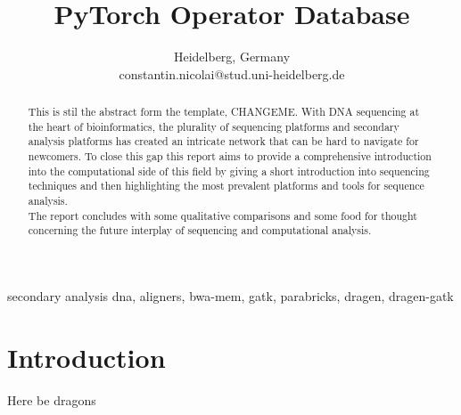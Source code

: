 \documentclass[conference]{IEEEtran}
\begin{document}
\title{PyTorch Operator Database}

\author{
Heidelberg, Germany \\
constantin.nicolai@stud.uni-heidelberg.de}


\maketitle

\begin{abstract}
This is stil the abstract form the template, CHANGEME. With DNA sequencing at the heart of bioinformatics, the plurality of sequencing platforms and secondary analysis platforms has created an intricate network that can be hard to navigate for newcomers. To close this gap this report aims to provide a comprehensive introduction into the computational side of this field by giving a short introduction into sequencing techniques and then highlighting the most prevalent platforms and tools for sequence analysis. \\
The report concludes with some qualitative comparisons and some food for thought concerning the future interplay of sequencing and computational analysis.
\end{abstract}

\begin{IEEEkeywords}
secondary analysis dna, aligners, bwa-mem, gatk, parabricks, dragen, dragen-gatk
\end{IEEEkeywords}

\section{Introduction}
Here be dragons
\end{document}
